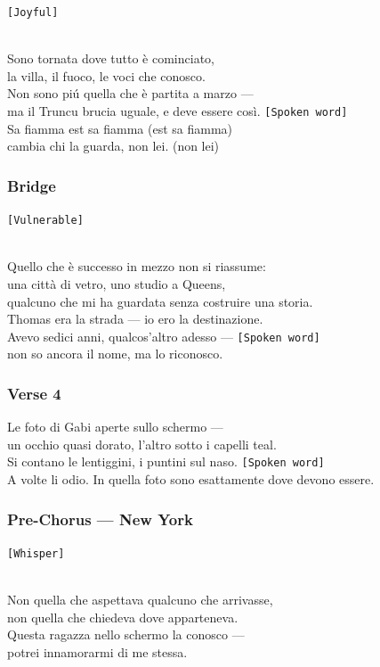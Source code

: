 \texttt{{[}Joyful{]}}\strut \\
Sono tornata dove tutto è cominciato,\\
la villa, il fuoco, le voci che conosco.\\
Non sono piú quella che è partita a marzo ---\\
ma il Truncu brucia uguale, e deve essere così.
\texttt{{[}Spoken\ word{]}}\\
Sa fiamma est sa fiamma (est sa fiamma)\\
cambia chi la guarda, non lei. (non lei)

\subsubsection{Bridge}\label{bridge-12}

\texttt{{[}Vulnerable{]}}\strut \\
Quello che è successo in mezzo non si riassume:\\
una città di vetro, uno studio a Queens,\\
qualcuno che mi ha guardata senza costruire una storia.\\
Thomas era la strada --- io ero la destinazione.\\
Avevo sedici anni, qualcos'altro adesso ---
\texttt{{[}Spoken\ word{]}}\\
non so ancora il nome, ma lo riconosco.

\subsubsection{Verse 4}\label{verse-4-8}

Le foto di Gabi aperte sullo schermo ---\\
un occhio quasi dorato, l'altro sotto i capelli teal.\\
Si contano le lentiggini, i puntini sul naso.
\texttt{{[}Spoken\ word{]}}\\
A volte li odio. In quella foto sono esattamente dove devono essere.

\subsubsection{Pre-Chorus --- New York}\label{pre-chorus-new-york}

\texttt{{[}Whisper{]}}\strut \\
Non quella che aspettava qualcuno che arrivasse,\\
non quella che chiedeva dove apparteneva.\\
Questa ragazza nello schermo la conosco ---\\
potrei innamorarmi di me stessa.

